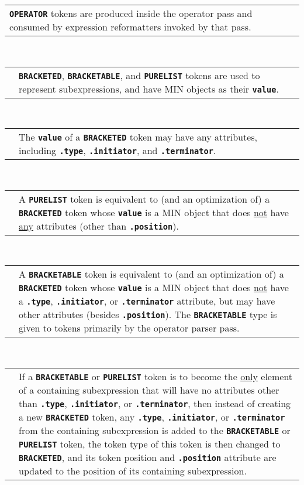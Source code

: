 \documentclass[12pt]{article}
\newcommand{\TT}[1]{{\tt \bfseries #1}}
\newenvironment{indpar}[1][0.3in]%
	{\begin{list}{}%
		     {\setlength{\itemsep}{0in}%
		      \setlength{\topsep}{0in}%
		      \setlength{\parsep}{1ex}%
		      \setlength{\labelwidth}{#1}%
		      \setlength{\leftmargin}{#1}%
		      \addtolength{\leftmargin}{\labelsep}}%
	 \item}%
	{\end{list}}
\begin{document}
\begin{indpar}
\begin{tabular}{p{1in}p{4.5in}}
		  \TT{OPERATOR} tokens are
		  produced inside the operator pass and consumed by
		  expression reformatters invoked by that pass.
\end{tabular}
\\[1ex]  
\begin{tabular}{p{1in}p{4.5in}}
		& \TT{BRACKETED}, \TT{BRACKETABLE}, and \TT{PURELIST} tokens
		  are used to represent subexpressions, and have
		  MIN objects as their \TT{value}.
\end{tabular}
\\[1ex]  
\begin{tabular}{p{1in}p{4.5in}}
		& The \TT{value} of a \TT{BRACKETED} token may have
		  any attributes, including \TT{.type},
		  \TT{.initiator}, and \TT{.terminator}.
\end{tabular}
\\[1ex]  
\begin{tabular}{p{1in}p{4.5in}}
		& A \TT{PURELIST} token
		  is equivalent to (and an optimization of) a \TT{BRACKETED}
		  token whose \TT{value} is a MIN object
		  that does \underline{not} have \underline{any}
		  attributes (other than \TT{.position}).
\end{tabular}
\\[1ex]  
\begin{tabular}{p{1in}p{4.5in}}
		& A \TT{BRACKETABLE} token
		  is equivalent to (and an optimization of) a \TT{BRACKETED}
		  token whose \TT{value} is a MIN object
		  that does \underline{not} have
		  a \TT{.type}, \TT{.initiator}, or \TT{.terminator}
		  attribute, but may have other attributes
		  (besides \TT{.position}).
		  The \TT{BRACKETABLE} type is given to tokens primarily
		  by the operator parser pass.
\end{tabular}
\\[1ex]  
\begin{tabular}{p{1in}p{4.5in}}
		& If a \TT{BRACKETABLE} or \TT{PURELIST} token
		  is to become the \underline{only} element of a
		  containing subexpression that will have no attributes other
		  than \TT{.type}, \TT{.initiator}, or \TT{.terminator}, 
		  then instead of creating a new
		  \TT{BRACKETED} token, any \TT{.type}, \TT{.initiator},
		  or \TT{.terminator} from the containing subexpression
		  is added to the \TT{BRACKETABLE} or \TT{PURELIST} token,
		  the token type of this token is then
		  changed to \TT{BRACKETED}, and
		  its token position and \TT{.position} attribute are
		  updated to the position of its containing subexpression.
\end{tabular}

\end{indpar}
\end{document}
